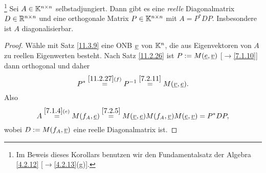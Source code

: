 \documentclass[../../main.tex]{subfiles}
\begin{document}
\begin{kor}\footnote{Im Beweis dieses Korollars benutzen wir den Fundamentalsatz der Algebra \ref{4.2.12} [$\to$\ref{4.2.13}(g)].}\label{11.3.10}
Sei $A\in\mathbb K^{n\times n}$ selbstadjungiert. Dann gibt es eine
\emph{reelle} Diagonalmatrix $D\in\mathbb R^{n\times n}$ und eine orthogonale Matrix $P\in\mathbb K^{n\times n}$ mit
$A=P^*DP$. Insbesondere ist $A$ diagonalisierbar.
\end{kor}

\begin{proof}
Wähle mit Satz \ref{11.3.9} eine ONB ${\underline v}$ von $\mathbb K^n$, die aus Eigenvektoren von $A$ zu reellen Eigenwerten
besteht. Nach Satz \ref{11.2.26} ist $P:=M({\underline e},{\underline v})$ [$\to$\ref{7.1.10}] dann orthogonal und daher \[P^*\overset{\ref{11.2.27}(f)}=P^{-1}\overset{\ref{7.2.11}}=M({\underline v},{\underline e}).\] Also
\[A\overset{\ref{7.1.4}(e)}=M(f_A,{\underline e})\overset{\ref{7.2.5}}=M({\underline v},{\underline e})M(f_A,{\underline v})M({\underline e},{\underline v})=P^*DP,\]
 wobei $D:=M(f_A,{\underline v})$ eine reelle Diagonalmatrix ist.
\end{proof}

\end{document}
